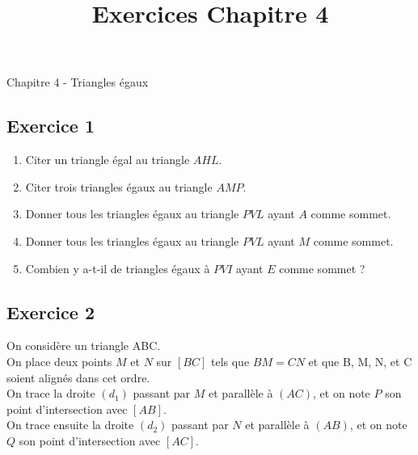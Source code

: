 \documentclass[12 pt]{extarticle}
\title{Exercices Chapitre 4}
\date{}
\theoremstyle{plain}
\newcounter{AlphNode}
\renewcommand*{\theAlphNode}{\Alph{AlphNode}}
\begin{document}
\begin{center}{\Large Chapitre 4 - Triangles égaux}\\
 \end{center} 
 
 \subsection*{Exercice 1}
 \begin{figure}[H]
 \center
 \end{figure}
  
  \begin{enumerate}
  \item Citer un triangle égal au triangle $AHL$. 
  \item Citer trois triangles égaux au triangle $AMP$. 
  \item Donner tous les triangles égaux au triangle $PVL$ ayant $A$ comme sommet.
   \item Donner tous les triangles égaux au triangle $PVL$ ayant $M$ comme sommet.
  \item Combien y a-t-il de triangles égaux à $PVI$ ayant $E$ comme sommet ? 
  \end{enumerate}
  
  \subsection*{Exercice 2}
  
 On considère un triangle ABC. \\
 On place deux points $M$ et $N$ sur $[BC]$ tels que $BM=CN$
 et que B, M, N, et C soient alignés dans cet ordre. \\
 On trace la droite $(d_1)$ passant par $M$ et parallèle à $(AC)$, et on note $P$ son point d'intersection avec $[AB]$. \\
 On trace ensuite la droite $(d_2)$ passant par $N$ et parallèle à $(AB)$, et on note $Q$ son point d'intersection avec $[AC]$. \\
 
\end{document}
